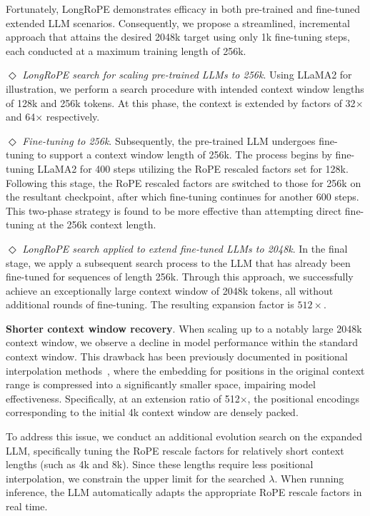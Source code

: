 Fortunately, LongRoPE demonstrates efficacy in both pre-trained and fine-tuned extended LLM scenarios. Consequently, we propose a streamlined, incremental approach that attains the desired 2048k target using only 1k fine-tuning steps, each conducted at a maximum training length of 256k.

$\Diamond$ \textit{LongRoPE search for scaling pre-trained LLMs to 256k}. Using LLaMA2 for illustration, we perform a search procedure with intended context window lengths of 128k and 256k tokens. At this phase, the context is extended by factors of 32$\times$ and 64$\times$ respectively.

$\Diamond$ \textit{Fine-tuning to 256k}. Subsequently, the pre-trained LLM undergoes fine-tuning to support a context window length of 256k. The process begins by fine-tuning LLaMA2 for 400 steps utilizing the RoPE rescaled factors set for 128k. Following this stage, the RoPE rescaled factors are switched to those for 256k on the resultant checkpoint, after which fine-tuning continues for another 600 steps. This two-phase strategy is found to be more effective than attempting direct fine-tuning at the 256k context length.

$\Diamond$ \textit{LongRoPE search applied to extend fine-tuned LLMs to 2048k}. In the final stage, we apply a subsequent search process to the LLM that has already been fine-tuned for sequences of length 256k. Through this approach, we successfully achieve an exceptionally large context window of 2048k tokens, all without additional rounds of fine-tuning. The resulting expansion factor is $512\times$.

\textbf{Shorter context window recovery}.  When scaling up to a notably large 2048k context window, we observe a decline in model performance within the standard context window. This drawback has been previously documented in positional interpolation methods~\cite{pi}, where the embedding for positions in the original context range is compressed into a significantly smaller space, impairing model effectiveness. Specifically, at an extension ratio of 512$\times$, the positional encodings corresponding to the initial 4k context window are densely packed.

To address this issue, we conduct an additional evolution search on the expanded LLM, specifically tuning the RoPE rescale factors for relatively short context lengths (such as 4k and 8k). Since these lengths require less positional interpolation, we constrain the upper limit for the searched $\lambda$. When running inference, the LLM automatically adapts the appropriate RoPE rescale factors in real time.

